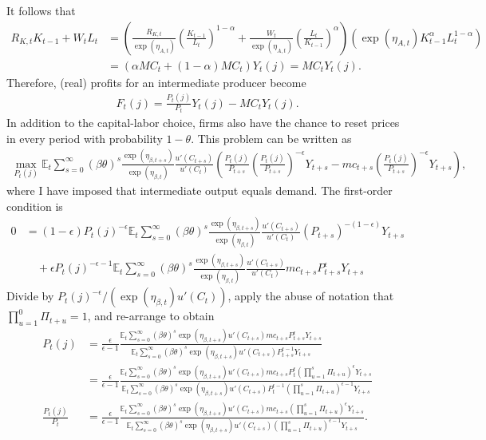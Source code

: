 \documentclass[12 pt, oneside]{article}
\theoremstyle{definition}
\theoremstyle{definition}
\theoremstyle{definition}
\newcommand{\E}{\mathbb{E}}
\begin{document}
It follows that
\begin{align*}
  R_{K, t}K_{t - 1} + W_tL_t & = \left(\frac{R_{K, t}}{\exp(\eta_{A, t})}\left(\frac{K_{t - 1}}{L_t}\right)^{1 - \alpha} + \frac{W_t}{\exp(\eta_{A, t})}\left(\frac{L_t}{K_{t - 1}}\right)^{\alpha}\right)(\exp(\eta_{A, t})K_{t - 1}^\alpha L_t^{1 - \alpha})\\
                       & = \left(\alpha MC_t + (1 - \alpha)MC_t\right)Y_t(j) = MC_t Y_t(j).
\end{align*}
Therefore, (real) profits for an intermediate producer become
\begin{align*}
  F_t(j) = \frac{P_t(j)}{P_t}Y_t(j) - MC_t Y_t(j).
\end{align*}
In addition to the capital-labor choice, firms also have the chance to reset prices in every period with probability $1 - \theta$. This problem can be
written as
\begin{align*}
  \max_{P_t(j)} \E_t\sum_{s = 0}^\infty(\beta \theta)^s\frac{\exp(\eta_{\beta, t + s})}{\exp(\eta_{\beta, t})}\frac{u'(C_{t + s})}{u'(C_t)}\left(\frac{P_t(j)}{P_{t + s}}\left(\frac{P_t(j)}{P_{t + s}}\right)^{-\epsilon}Y_{t + s} - mc_{t + s}\left(\frac{P_t(j)}{P_{t + s}}\right)^{-\epsilon}Y_{t + s}\right),
\end{align*}
where I have imposed that intermediate output equals demand. The first-order condition is
\begin{align*}
0 & =  (1 - \epsilon)P_t(j)^{-\epsilon}\E_t\sum_{s = 0}^\infty (\beta\theta)^s \frac{\exp(\eta_{\beta, t + s})}{\exp(\eta_{\beta, t})}\frac{u'(C_{t + s})}{u'(C_t)}(P_{t + s})^{-(1 - \epsilon)}Y_{t + s}\\
  &\quad + \epsilon P_t(j)^{-\epsilon - 1}\E_t\sum_{s = 0}^\infty (\beta\theta)^s \frac{\exp(\eta_{\beta, t + s})}{\exp(\eta_{\beta, t})}\frac{u'(C_{t + s})}{u'(C_t)} mc_{t + s}P_{t + s}^{\epsilon}Y_{t + s}
\end{align*}
Divide by $P_t(j)^{-\epsilon} / (\exp(\eta_{\beta, t})u'(C_t))$, apply the abuse of notation that $\prod_{u = 1}^0 \Pi_{t + u} = 1$, and re-arrange to obtain
\begin{align*}
  P_t(j) & = \frac{\epsilon}{\epsilon - 1}\frac{\E_t\sum_{s = 0}^\infty (\beta\theta)^s \exp(\eta_{\beta, t + s})u'(C_{t + s}) mc_{t + s}P_{t + s}^{\epsilon}Y_{t + s}}{\E_t\sum_{s = 0}^\infty (\beta\theta)^s \exp(\eta_{\beta, t + s})u'(C_{t + s})P_{t + s}^{\epsilon - 1}Y_{t + s}}\\
         & = \frac{\epsilon}{\epsilon - 1}\frac{\E_t\sum_{s = 0}^\infty (\beta\theta)^s \exp(\eta_{\beta, t + s})u'(C_{t + s}) mc_{t + s}P_t^\epsilon\left(\prod_{u = 1}^s\Pi_{t + u}\right)^{\epsilon}Y_{t + s}}{\E_t\sum_{s = 0}^\infty (\beta\theta)^s \exp(\eta_{\beta, t + s})u'(C_{t + s})P_t^{\epsilon - 1}\left(\prod_{u = 1}^s\Pi_{t + u}\right)^{\epsilon - 1}Y_{t + s}}\\
  \frac{P_t(j)}{P_t} & = \frac{\epsilon}{\epsilon - 1}\frac{\E_t\sum_{s = 0}^\infty (\beta\theta)^s \exp(\eta_{\beta, t + s})u'(C_{t + s}) mc_{t + s}\left(\prod_{u = 1}^s\Pi_{t + u}\right)^{\epsilon}Y_{t + s}}{\E_t\sum_{s = 0}^\infty (\beta\theta)^s \exp(\eta_{\beta, t + s})u'(C_{t + s})\left(\prod_{u = 1}^s\Pi_{t + u}\right)^{\epsilon - 1}Y_{t + s}}.
\end{align*}
\end{document}
